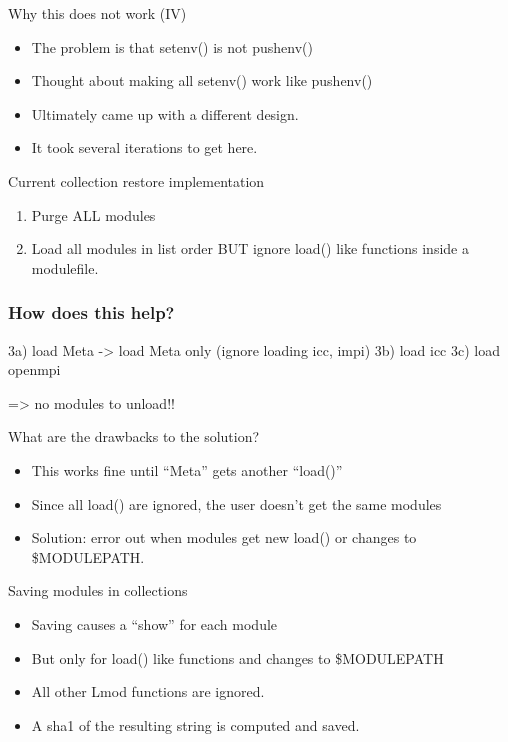 \documentclass{beamer}
\begin{document}
\begin{frame}{Why this does not work (IV)}
  \begin{itemize}
    \item The problem is that setenv() is not pushenv()
    \item Thought about making all setenv() work like pushenv()
    \item Ultimately came up with a different design. 
    \item It took several iterations to get here.
  \end{itemize}
\end{frame}

\begin{frame}{Current collection restore implementation}
  \begin{enumerate}
    \item Purge ALL modules
    \item Load all modules in list order BUT ignore load() like
      functions inside a modulefile.
  \end{enumerate}
\end{frame}

\begin{frame}[fragile]
  \frametitle{How does this help?}
    {\small
\begin{semiverbatim}
   
   3a) load Meta -> load Meta only (ignore loading icc, impi)
   3b) load icc
   3c) load openmpi

=> no modules to unload!!
\end{semiverbatim}
    }
\end{frame}

\begin{frame}{What are the drawbacks to the solution?}
  \begin{itemize}
    \item This works fine until ``Meta'' gets another ``load()''
    \item Since all load() are ignored, the user doesn't get the same
      modules
    \item Solution: error out when modules get new load() or changes
      to \$MODULEPATH.
  \end{itemize}
\end{frame}

\begin{frame}{Saving modules in collections}
  \begin{itemize}
    \item Saving causes a ``show'' for each module
    \item But only for load() like functions and changes to \$MODULEPATH
    \item All other Lmod functions are ignored. 
    \item A sha1 of the resulting string is computed and saved.
  \end{itemize}
\end{frame}
\end{document}
